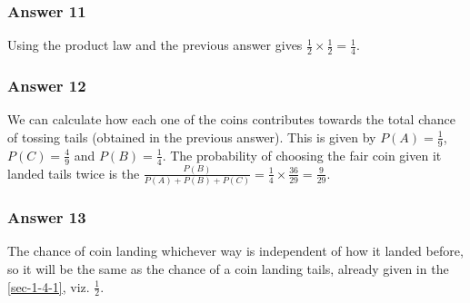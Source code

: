 \documentclass[11pt]{article}
\begin{document}
\subsubsection{Answer 11}
\label{sec-1-4-2}
Using the product law and the previous answer gives
$\frac{1}{2} \times \frac{1}{2} = \frac{1}{4}$.
\subsubsection{Answer 12}
\label{sec-1-4-3}
We can calculate how each one of the coins contributes towards the total
chance of tossing tails (obtained in the previous answer).  This is given by
$P(A) = \frac{1}{9}$, $P(C) = \frac{4}{9}$ and $P(B) = \frac{1}{4}$.  The
probability of choosing the fair coin given it landed tails twice is the
$\frac{P(B)}{P(A) + P(B) + P(C)} = \frac{1}{4} \times \frac{36}{29} = \frac{9}{29}$.
\subsubsection{Answer 13}
\label{sec-1-4-4}
The chance of coin landing whichever way is independent of how it landed before,
so it will be the same as the chance of a coin landing tails, already given
in the \ref{sec-1-4-1}, viz. $\frac{1}{2}$.
\end{document}
